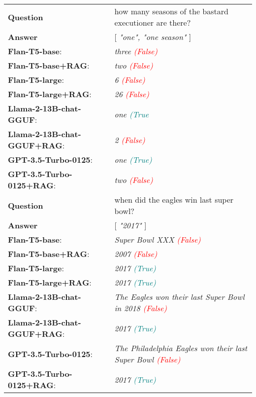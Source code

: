 \begin{table*}
{\begin{tabular}{ll}
    \midrule
    
    \textbf{Question} & how many seasons of the bastard executioner are there? \\
    \textbf{Answer} & [ \emph{"one", "one season"} ] \\
    \textbf{Flan-T5-base}: & \emph{three \textcolor{red}{(False)}} \\
    \textbf{Flan-T5-base+RAG}: & \emph{two \textcolor{red}{(False)}} \\
    \textbf{Flan-T5-large}: & \emph{6 \textcolor{red}{(False)}} \\
    \textbf{Flan-T5-large+RAG}: & \emph{26 \textcolor{red}{(False)}} \\
    \textbf{Llama-2-13B-chat-GGUF}: & \emph{one \textcolor{teal}{(True}} \\
    \textbf{Llama-2-13B-chat-GGUF+RAG}: & \emph{2 \textcolor{red}{(False)}} \\
    \textbf{GPT-3.5-Turbo-0125}: & \emph{one \textcolor{teal}{(True)}} \\
    \textbf{GPT-3.5-Turbo-0125+RAG}: & \emph{two \textcolor{red}{(False)}} \\
    
    \midrule
    
    \textbf{Question} & when did the eagles win last super bowl? \\
    \textbf{Answer} & [ \emph{"2017"} ] \\
    \textbf{Flan-T5-base}: & \emph{Super Bowl XXX \textcolor{red}{(False)}} \\
    \textbf{Flan-T5-base+RAG}: & \emph{2007 \textcolor{red}{(False)}} \\
    \textbf{Flan-T5-large}: & \emph{2017 \textcolor{teal}{(True)}} \\
    \textbf{Flan-T5-large+RAG}: & \emph{2017 \textcolor{teal}{(True)}} \\
    \textbf{Llama-2-13B-chat-GGUF}: & \emph{The Eagles won their last Super Bowl in 2018 \textcolor{red}{(False)}} \\
    \textbf{Llama-2-13B-chat-GGUF+RAG}: & \emph{2017 \textcolor{teal}{(True)}} \\
    \textbf{GPT-3.5-Turbo-0125}: & \emph{The Philadelphia Eagles won their last Super Bowl \textcolor{red}{(False)}} \\
    \textbf{GPT-3.5-Turbo-0125+RAG}: & \emph{2017 \textcolor{teal}{(True)}} \\
    
    \midrule
    

\end{tabular}}
\end{table*}
